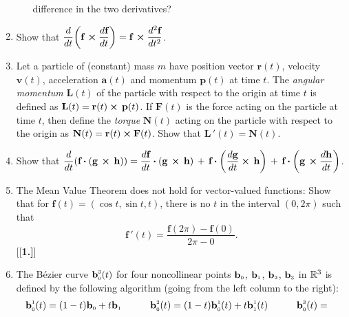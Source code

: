 \begin{enumerate}[\bfseries 1.]
\begin{enumerate}[(a)]
    difference in the two derivatives?
  \end{enumerate}
 \item Show that $\dfrac{d}{dt} \biggl( \textbf{f}\, \bm{\times} \dfrac{d\textbf{f}}{dt} \biggr) =
  \textbf{f}\, \bm{\times} \dfrac{d^2 \textbf{f}}{dt^2}$.
 \item Let a particle of (constant) mass $m$ have position vector $\textbf{r}(t)$, velocity $\textbf{v}(t)$,
  acceleration $\textbf{a}(t)$ and momentum $\textbf{p}(t)$ at time $t$. The \emph{angular momentum} $\textbf{L}(t)$ of
  the particle with respect to the origin at time $t$ is defined as $\textbf{L}(t) =
  \textbf{r}(t) \bm{\times} \,\textbf{p}(t)$. If $\textbf{F}(t)$ is the force acting on the particle at time $t$, then
  define the \emph{torque} $\textbf{N}(t)$ acting on the particle with respect to the origin as
  $\textbf{N}(t) = \textbf{r}(t) \bm{\times} \textbf{F}(t)$. Show that $\textbf{L}\,'(t) = \textbf{N}(t)$.
 \item Show that $\dfrac{d}{dt} ( \textbf{f} \bm{\cdot} ( \textbf{g}\, \bm{\times} \,\textbf{h} ) ) =
  \dfrac{d\textbf{f}}{dt} \bm{\cdot} (\textbf{g}\, \bm{\times} \,\textbf{h}) \,+\,
  \textbf{f} \bm{\cdot} \biggl(\dfrac{d \textbf{g}}{dt} \bm{\times} \,\textbf{h}\biggr) \,+\,
  \textbf{f} \bm{\cdot} \biggl(\textbf{g}\, \bm{\times} \dfrac{d \textbf{h}}{dt}\biggr)$.
 \item The Mean Value Theorem does not hold for vector-valued functions:
 Show that for $\textbf{f}(t) = (\cos t, \sin t,t)$, there is no $t$ in the interval $(0,2\pi)$ such that
 \begin{displaymath}
  \textbf{f}\,'(t) = \dfrac{\textbf{f}(2\pi) - \textbf{f}(0)}{2\pi - 0} .
 \end{displaymath}
[{[\bfseries 1.]}]
 \item The B\'{e}zier curve $\textbf{b}_{\scriptscriptstyle 0}^{\scriptscriptstyle 3}(t)$ for four noncollinear points
  $\textbf{b}_{\scriptscriptstyle 0}$, $\textbf{b}_{\scriptscriptstyle 1}$, $\textbf{b}_{\scriptscriptstyle 2}$, $\textbf{b}_{\scriptscriptstyle 3}$ in $\mathbb{R}^{3}$ is
  defined by the following algorithm (going from the left column to the right):
  \begin{alignat*}{3}
   \ssub{\textbf{b}}{0}^{\scriptscriptstyle 1}(t) &= ( 1 - t )\ssub{\textbf{b}}{0} + t \ssub{\textbf{b}}{1} \qquad
    & \ssub{\textbf{b}}{0}^{\scriptscriptstyle 2}(t) &=
    ( 1 - t )\ssub{\textbf{b}}{0}^{\scriptscriptstyle 1}(t) + t \ssub{\textbf{b}}{1}^{\scriptscriptstyle 1}(t) \qquad
    & \ssub{\textbf{b}}{0}^{\scriptscriptstyle 3}(t) &=

\end{alignat*}
\end{enumerate}
